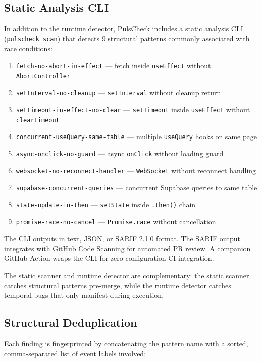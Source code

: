 \documentclass[11pt,a4paper]{article}
\begin{document}
\subsection{Static Analysis CLI}

In addition to the runtime detector, PulsCheck includes a static analysis CLI (\texttt{pulscheck scan}) that detects 9 structural patterns commonly associated with race conditions:

\begin{enumerate}
  \item \texttt{fetch-no-abort-in-effect} --- fetch inside \texttt{useEffect} without \texttt{AbortController}
  \item \texttt{setInterval-no-cleanup} --- \texttt{setInterval} without cleanup return
  \item \texttt{setTimeout-in-effect-no-clear} --- \texttt{setTimeout} inside \texttt{useEffect} without \texttt{clearTimeout}
  \item \texttt{concurrent-useQuery-same-table} --- multiple \texttt{useQuery} hooks on same page
  \item \texttt{async-onclick-no-guard} --- async \texttt{onClick} without loading guard
  \item \texttt{websocket-no-reconnect-handler} --- \texttt{WebSocket} without reconnect handling
  \item \texttt{supabase-concurrent-queries} --- concurrent Supabase queries to same table
  \item \texttt{state-update-in-then} --- \texttt{setState} inside \texttt{.then()} chain
  \item \texttt{promise-race-no-cancel} --- \texttt{Promise.race} without cancellation
\end{enumerate}

The CLI outputs in text, JSON, or SARIF 2.1.0 format. The SARIF output integrates with GitHub Code Scanning for automated PR review. A companion GitHub Action wraps the CLI for zero-configuration CI integration.

The static scanner and runtime detector are complementary: the static scanner catches structural patterns pre-merge, while the runtime detector catches temporal bugs that only manifest during execution.

\subsection{Structural Deduplication}

Each finding is fingerprinted by concatenating the pattern name with a sorted, comma-separated list of event labels involved:
\end{document}
